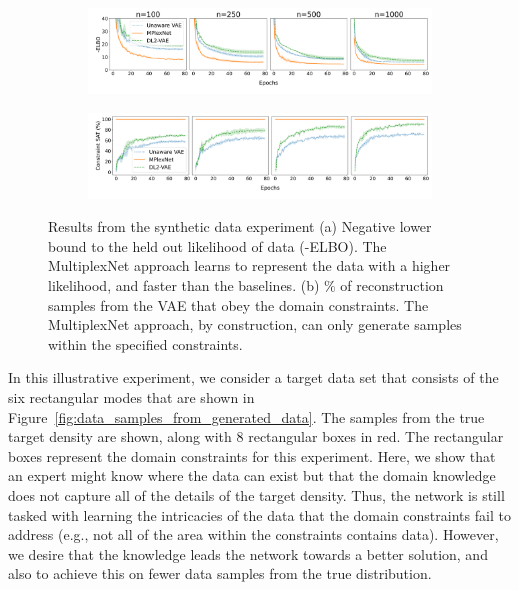 \documentclass[letterpaper]{article} %
\begin{document}
\begin{figure}
     \centering
     \begin{subfigure}[b]{.8\textwidth}
         \centering
         \includegraphics[width=\textwidth]{images/synthetic_experiment_elbo.png}
         \caption{}
         \label{fig:synthetic_experiment_computational_results_subplot-a}
     \end{subfigure}

     \begin{subfigure}[b]{.8\textwidth}
         \centering
         \includegraphics[width=\textwidth]{images/synthetic_experiment_constraint_satisfaction.png}
         \caption{}
         \label{fig:synthetic_experiment_computational_results_subplot-b}
     \end{subfigure}

        \caption{Results from the synthetic data experiment (a) Negative lower bound to the held out likelihood of data (-ELBO). The MultiplexNet approach learns to represent the data with a higher likelihood, and faster than the baselines. (b) $\%$ of reconstruction samples from the VAE that obey the domain constraints. The MultiplexNet approach, by construction, can only generate samples within the specified constraints.}
        \label{fig:synthetic_experiment_computational_results}
\end{figure}

In this illustrative experiment, we consider a target data set that consists of the six rectangular modes that are shown in Figure~\ref{fig:data_samples_from_generated_data}.
The samples from the true target density are shown, along with $8$ rectangular boxes in red.
The rectangular boxes represent the domain constraints for this experiment.
Here, we show that an expert might know where the data can exist but that the domain knowledge does not capture all of the details of the target density.
Thus, the network is still tasked with learning the intricacies of the data that the domain constraints fail to address (e.g., not all of the area within the constraints contains data).
However, we desire that the knowledge leads the network towards a better solution, and also to achieve this on fewer data samples from the true distribution.
\end{document}
